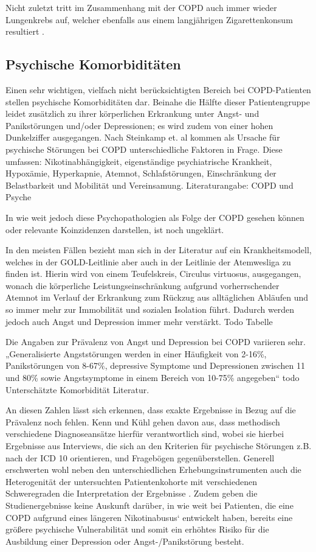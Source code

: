 Nicht zuletzt tritt im Zusammenhang mit der COPD auch immer wieder Lungenkrebs auf, welcher ebenfalls aus einem langjährigen Zigarettenkonsum resultiert \autocite[vgl.][38]{stiefelhagen2013}.


\subsection{Psychische Komorbiditäten}
\label{psychische_komorbiditaet}
Einen sehr wichtigen, vielfach nicht berücksichtigten Bereich bei COPD-Patienten stellen psychische Komorbiditäten dar.  Beinahe die Hälfte dieser Patientengruppe leidet zusätzlich zu ihrer körperlichen Erkrankung unter Angst- und Panikstörungen und/oder Depressionen; es wird zudem von einer hohen Dunkelziffer ausgegangen. Nach Steinkamp et. al kommen als Ursache für psychische Störungen bei COPD unterschiedliche Faktoren in Frage. Diese umfassen: Nikotinabhängigkeit, eigenständige psychiatrische Krankheit, Hypoxämie, Hyperkapnie, Atemnot, Schlafstörungen, Einschränkung der Belastbarkeit und Mobilität und Vereinsamung. Literaturangabe: COPD und Psyche 
 
In wie weit jedoch diese Psychopathologien als Folge der COPD gesehen können oder relevante Koinzidenzen darstellen, ist noch ungeklärt. 

In den meisten Fällen bezieht man sich in der Literatur auf ein Krankheitsmodell, welches in der GOLD-Leitlinie aber auch in der Leitlinie der Atemwesliga zu finden ist. Hierin wird von einem Teufelskreis, Circulus virtuosus, ausgegangen, wonach die körperliche Leistungseinschränkung aufgrund vorherrschender Atemnot im Verlauf der Erkrankung zum Rückzug aus alltäglichen Abläufen und so immer mehr zur Immobilität und sozialen Isolation führt. Dadurch werden jedoch auch Angst und Depression immer mehr verstärkt. Todo Tabelle 

Die Angaben zur Prävalenz von Angst und Depression bei COPD variieren sehr. „Generalisierte Angststörungen werden in einer Häufigkeit von 2-16\%, Panikstörungen von 8-67\%, depressive Symptome und Depressionen zwischen 11 und 80\% sowie Angstsymptome in einem Bereich von 10-75\% angegeben“  \autocite[34]{kenn2011} todo Unterschätzte Komorbidität Literatur.

An diesen Zahlen lässt sich erkennen, dass exakte Ergebnisse in Bezug auf die Prävalenz noch fehlen. Kenn und Kühl gehen davon aus, dass methodisch verschiedene Diagnoseansätze hierfür verantwortlich sind, wobei sie hierbei Ergebnisse aus Interviews, die sich an den Kriterien für psychische Störungen z.B. nach der ICD 10 orientieren, und Fragebögen gegenüberstellen. Generell erschwerten wohl neben den unterschiedlichen Erhebungsinstrumenten auch die Heterogenität der untersuchten Patientenkohorte mit verschiedenen Schweregraden die Interpretation der Ergebnisse \autocite[vgl.][35]{kenn2011}.
Zudem geben die Studienergebnisse keine Auskunft darüber, in wie weit bei Patienten, die eine COPD aufgrund eines längeren Nikotinabusus‘ entwickelt haben, bereits eine größere psychische Vulnerabilität und somit ein erhöhtes Risiko für die Ausbildung einer Depression oder Angst-/Panikstörung besteht. 

